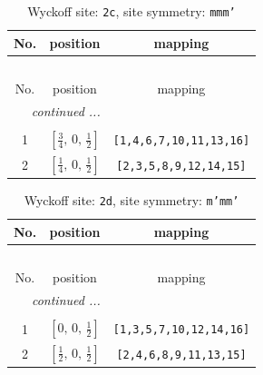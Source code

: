 \documentclass[fleqn,8pt]{jsarticle}
\begin{document}
\renewcommand{\arraystretch}{1.2}
\begin{longtable}{ccc}
\caption{Wyckoff site: {\tt 2c}, site symmetry: {\tt mmm'}}
 \\
 \hline \hline
No. & position & mapping \\ \hline \endfirsthead

\multicolumn{2}{l}{\tablename\ \thetable{}} \\
 \hline \hline
No. & position & mapping \\ \hline \endhead

 \hline \hline
\multicolumn{2}{r}{\footnotesize\it continued ...} \\ \endfoot

 \hline \hline
\multicolumn{2}{r}{} \\ \endlastfoot

1 & $\left[ \frac{3}{4},\, 0,\, \frac{1}{2} \right]$ & {\tt [1,4,6,7,10,11,13,16]} \\ \hline
2 & $\left[ \frac{1}{4},\, 0,\, \frac{1}{2} \right]$ & {\tt [2,3,5,8,9,12,14,15]} \\
\end{longtable}
\renewcommand{\arraystretch}{1.2}
\begin{longtable}{ccc}
\caption{Wyckoff site: {\tt 2d}, site symmetry: {\tt m'mm'}}
 \\
 \hline \hline
No. & position & mapping \\ \hline \endfirsthead

\multicolumn{2}{l}{\tablename\ \thetable{}} \\
 \hline \hline
No. & position & mapping \\ \hline \endhead

 \hline \hline
\multicolumn{2}{r}{\footnotesize\it continued ...} \\ \endfoot

 \hline \hline
\multicolumn{2}{r}{} \\ \endlastfoot

1 & $\left[ 0,\, 0,\, \frac{1}{2} \right]$ & {\tt [1,3,5,7,10,12,14,16]} \\ \hline
2 & $\left[ \frac{1}{2},\, 0,\, \frac{1}{2} \right]$ & {\tt [2,4,6,8,9,11,13,15]} \\
\end{longtable}
\renewcommand{\arraystretch}{1.2}
\end{document}
